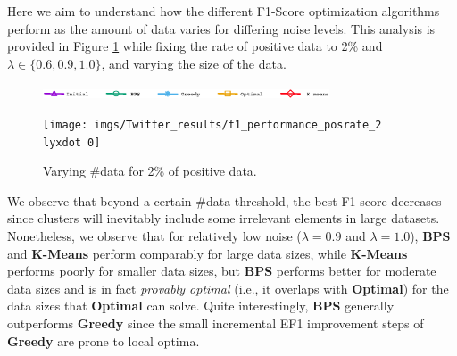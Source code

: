  Here we aim to understand how the different F1-Score optimization algorithms perform as the amount of data varies for differing noise levels.  This analysis is provided in Figure  \ref{fig:F1_vs_Data_Twitter} while fixing the rate of positive data to 2\% and $\lambda \in \{0.6,0.9,1.0\}$, and  varying the size of the data.

\begin{figure}[H]
\begin{centering}
\includegraphics[width=8.5cm]{imgs/legend1}
\par\end{centering}
\begin{centering}
{\texttt{[image: imgs/Twitter\_results/f1\_performance\_posrate\_2\\lyxdot 0]}}
\par\end{centering}
\caption{Varying \#data for 2\% of positive data.}
\label{fig:F1_vs_Data_Twitter}
\end{figure}











We observe that beyond a certain \#data threshold, the best F1 score decreases since clusters will inevitably include some irrelevant elements in large datasets.  Nonetheless, we observe that for relatively low noise ($\lambda=0.9$ and $\lambda=1.0$), {\bf BPS} and {\bf $\mathbf{K}$-Means} perform comparably for large data sizes, while {\bf $\mathbf{K}$-Means} performs poorly for smaller data sizes, but {\bf BPS} performs better for moderate data sizes and is in fact \emph{provably optimal} (i.e., it overlaps with {\bf Optimal}) for the data sizes that {\bf Optimal} can solve.  Quite interestingly, {\bf BPS} generally outperforms {\bf Greedy} since the small incremental EF1 improvement steps of {\bf Greedy} are prone to local optima.

